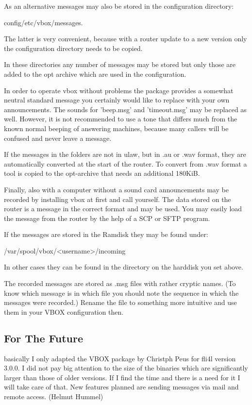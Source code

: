 As an alternative messages may also be stored in the configuration directory:

config/etc/vbox/messages.

The latter is very convenient, because with a router update to a new version
only the configuration directory needs to be copied.

In these directories any number of messages may be stored but only those
are added to the opt archive which are used in the configuration.

In order to operate vbox without problems the package provides a somewhat neutral
standard message you certainly would like to replace with your own announcements.
The sounds for 'beep.msg' and 'timeout.msg' may be replaced as well. However, it
is not recommended to use a tone that differs much from the known normal beeping
of answering machines, because many callers will be confused and never leave a message.

If the messages in the folders are not in ulaw, but in .au or .wav format, they are
automatically converted at the start of the router. To convert from .wav format
a tool is copied to the opt-archive that needs an additional 180KiB.

Finally, also with a computer without a sound card announcements may be recorded
by installing vbox at first and call yourself. The data stored on the router is a
message in the correct format and may be used. You may easily load the message
from the router by the help of a SCP or SFTP program.

If the messages are stored in the Ramdisk they may be found under:

/var/spool/vbox/<username>/incoming

In other cases they can be found in the directory on the harddisk you set above.

The recorded messages are stored as .msg files with rather cryptic names. 
(To know which message is in which file you should note the sequence in which the
messages were recorded.) Rename the file to something more intuitive and 
use them in your VBOX configuration then.

\subsection{For The Future}

basically I only adapted the VBOX package by Christph Peus for fli4l version 3.0.0.
I did not pay big attention to the size of the binaries which are significantly larger
than those of older versions. If I find the time and there is a need for it I will take care
of that. New features planned are sending messages via mail and remote access. (Helmut Hummel)

